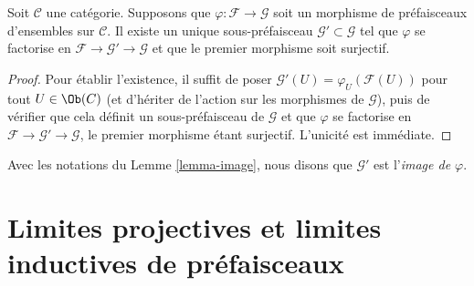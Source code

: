 \begin{lemma}
\label{lemma-image}
Soit $\mathcal{C}$ une catégorie.
Supposons que $\varphi : \mathcal{F} \to \mathcal{G}$ soit un
morphisme de préfaisceaux d’ensembles sur $\mathcal{C}$.
Il existe un unique sous-préfaisceau $\mathcal{G}' \subset \mathcal{G}$
tel que $\varphi$ se factorise en
$\mathcal{F} \to \mathcal{G}' \to \mathcal{G}$
et que le premier morphisme soit surjectif.
\end{lemma}

\begin{proof}
Pour établir l’existence, il suffit de poser
$\mathcal{G}'(U) = \varphi_U \left(\mathcal{F}(U)\right)$
pour tout $U \in \Ob(C)$ (et d’hériter de l’action sur les morphismes
de $\mathcal{G}$), puis de vérifier que cela définit un
sous-préfaisceau de $\mathcal{G}$ et que $\varphi$ se factorise en
$\mathcal{F} \to \mathcal{G}' \to \mathcal{G}$, le
premier morphisme étant surjectif. L’unicité est immédiate.
\end{proof}

\begin{definition}
\label{definition-image}
Avec les notations du Lemme \ref{lemma-image}, nous
disons que $\mathcal{G}'$ est l’{\it image de $\varphi$}.
\end{definition}
















\section{Limites projectives et limites inductives de préfaisceaux}
\label{section-limits-colimits-PSh}

